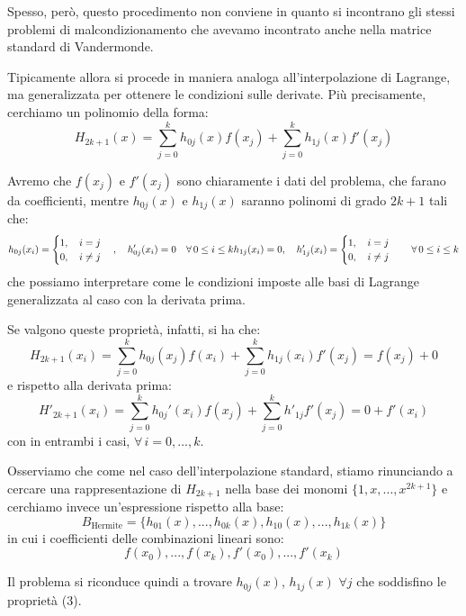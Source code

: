 \documentclass[a4paper,11pt]{article}
\begin{document}
Spesso, però, questo procedimento non conviene in quanto si incontrano gli stessi problemi di malcondizionamento che avevamo incontrato anche nella matrice standard di Vandermonde.

\par\smallskip

Tipicamente allora si procede in maniera analoga all'interpolazione di Lagrange, ma generalizzata per ottenere le condizioni sulle derivate.
Più precisamente, cerchiamo un polinomio della forma:
$$
H_{2k + 1}(x) = \sum_{j = 0}^k h_{0j}(x) f(x_j) + \sum_{j = 0}^k h_{1j}(x) f'(x_j)
$$

Avremo che $f(x_j)$ e $f'(x_j)$ sono chiaramente i dati del problema, che farano da coefficienti, mentre $h_{0j}(x)$ e $h_{1j}(x)$ saranno polinomi di grado $2k + 1$ tali che:
\begin{equation}
h_{0j}(x_i) =
\begin{cases}
	1, \quad i = j \\
	0, \quad i \neq j
\end{cases}, \quad
h'_{0j}(x_i) = 0  \quad \forall \, 0 \leq i \leq k
$$
$$
h_{1j}(x_i) = 0, \quad
h'_{1j}(x_i) =
\begin{cases}
	1, \quad i = j \\
	0, \quad i \neq j
\end{cases} \quad \forall \, 0 \leq i \leq k
\end{equation}
che possiamo interpretare come le condizioni imposte alle basi di Lagrange generalizzata al caso con la derivata prima.

Se valgono queste proprietà, infatti, si ha che:
$$
H_{2k + 1}(x_i) = \sum_{j = 0}^k h_{0j}(x_j) f(x_i) + \sum_{j = 0}^k h_{1j}(x_i) f'(x_j) = f(x_j) + 0 
$$
e rispetto alla derivata prima:
$$
H'_{2k + 1}(x_i) = \sum_{j = 0}^k h_{0j}'(x_i) f(x_j) + \sum_{j = 0}^k h'_{1j}f'(x_j) = 0 + f'(x_i)
$$
con in entrambi i casi, $\forall \, i = 0, ..., k$.

Osserviamo che come nel caso dell'interpolazione standard, stiamo rinunciando a cercare una rappresentazione di $H_{2k + 1}$ nella base dei monomi $\{ 1, x, ..., x^{2k + 1} \}$ e cerchiamo invece un'espressione rispetto alla base:
$$
	B_\text{Hermite} = \{ h_{01}(x), ..., h_{0k}(x), h_{10}(x), ..., h_{1k}(x) \}
$$
in cui i coefficienti delle combinazioni lineari sono:
$$
f(x_0), ..., f(x_k), f'(x_0), ..., f'(x_k)
$$

Il problema si riconduce quindi a trovare $h_{0j}(x)$, $h_{1j}(x)$ $\forall j$ che soddisfino le proprietà (3).
\end{document}
